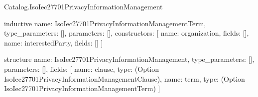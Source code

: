 \begin{lexlean}{Catalog.IsoIec27701PrivacyInformationManagement}
\begin{semanticmodule}
inductive{
  name: IsoIec27701PrivacyInformationManagementTerm,
  type_parameters: [],
  parameters: [],
  constructors: [
    {name: organization, fields: []},
    {name: interestedParty, fields: []}
  ]
}

structure{
  name: IsoIec27701PrivacyInformationManagement,
  type_parameters: [],
  parameters: [],
  fields: [
    {name: clause, type: (Option IsoIec27701PrivacyInformationManagementClause)},
    {name: term, type: (Option IsoIec27701PrivacyInformationManagementTerm)}
  ]
}
\end{semanticmodule}
\end{lexlean}

